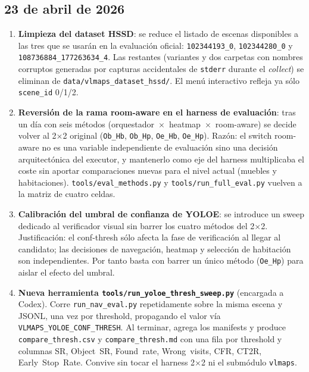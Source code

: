 \documentclass[11pt,a4paper]{article}
\begin{document}
\subsection*{23 de abril de 2026}

\begin{enumerate}

  \item \textbf{Limpieza del dataset HSSD}: se reduce el listado de escenas
        disponibles a las tres que se usarán en la evaluación oficial:
        \texttt{102344193\_0}, \texttt{102344280\_0} y
        \texttt{108736884\_177263634\_4}. Las restantes (variantes y dos
        carpetas con nombres corruptos generadas por capturas accidentales de
        \texttt{stderr} durante el \emph{collect}) se eliminan de
        \texttt{data/vlmaps\_dataset\_hssd/}. El menú interactivo refleja ya
        sólo \texttt{scene\_id} 0/1/2.

  \item \textbf{Reversión de la rama room-aware en el harness de evaluación}:
        tras un día con seis métodos
        (orquestador~$\times$~heatmap~$\times$~room-aware) se decide volver al
        2$\times$2 original (\texttt{Ob\_Hb}, \texttt{Ob\_Hp}, \texttt{Oe\_Hb},
        \texttt{Oe\_Hp}). Razón: el switch room-aware no es una variable
        independiente de evaluación sino una decisión arquitectónica del
        executor, y mantenerlo como eje del harness multiplicaba el coste sin
        aportar comparaciones nuevas para el nivel actual (muebles y
        habitaciones). \texttt{tools/eval\_methods.py} y
        \texttt{tools/run\_full\_eval.py} vuelven a la matriz de cuatro celdas.

  \item \textbf{Calibración del umbral de confianza de YOLOE}: se introduce un
        sweep dedicado al verificador visual sin barrer los cuatro métodos del
        2$\times$2. Justificación: el conf-thresh sólo afecta la fase de
        verificación al llegar al candidato; las decisiones de navegación,
        heatmap y selección de habitación son independientes. Por tanto basta
        con barrer un único método (\texttt{Oe\_Hp}) para aislar el efecto del
        umbral.

  \item \textbf{Nueva herramienta \texttt{tools/run\_yoloe\_thresh\_sweep.py}}
        (encargada a Codex). Corre \texttt{run\_nav\_eval.py} repetidamente
        sobre la misma escena y JSONL, una vez por threshold, propagando el
        valor vía \texttt{VLMAPS\_YOLOE\_CONF\_THRESH}. Al terminar, agrega los
        manifests y produce \texttt{compare\_thresh.csv} y
        \texttt{compare\_thresh.md} con una fila por threshold y columnas SR,
        Object~SR, Found~rate, Wrong~visits, CFR, CT2R, Early~Stop~Rate.
        Convive sin tocar el harness 2$\times$2 ni el submódulo \texttt{vlmaps}.


\end{enumerate}
\end{document}
